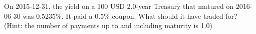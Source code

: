 On 2015-12-31, the yield on a 100 USD 2.0-year Treasury that matured on 2016-06-30 was 0.5235\%. It paid a 0.5\% coupon. What should it have traded for? (Hint: the number of payments up to and including maturity is 1.0)
